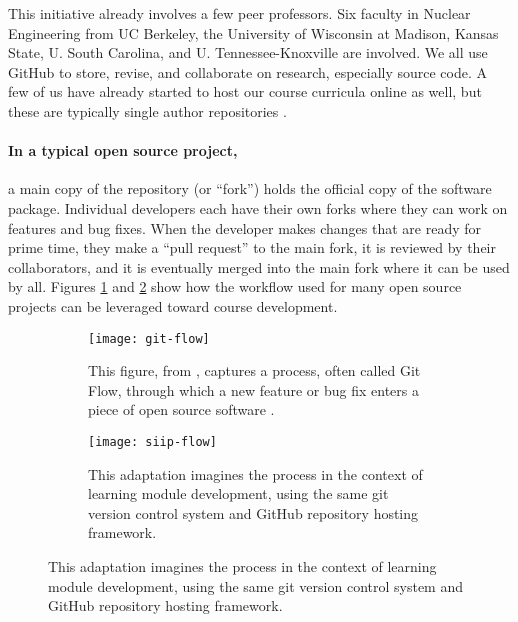 \documentclass[11pt]{article}
\begin{document}
          
          This initiative already involves a few peer professors. Six faculty 
          in Nuclear Engineering from UC Berkeley, the University of Wisconsin 
          at Madison, Kansas State, U. South Carolina, and U. 
          Tennessee-Knoxville are involved. We all use GitHub \cite{github} to 
          store, revise, and collaborate on research, especially source code. A 
          few of us have already started to host our course curricula online as 
          well, but these are typically single author repositories 
          \cite{skutnik,wilson,slaybaugh,scopatz,borelli,roberts}.

          \paragraph{In a typical open source project,} a main copy of the 
          repository (or ``fork'') holds the 
          official copy of the software package. Individual developers each have their own 
          forks where they can work on features and 
          bug fixes. When the developer makes changes that are ready for prime 
          time, they make a ``pull request'' to the main fork, it is 
          reviewed by their collaborators, and it is eventually merged into the 
          main fork where it can be used by all. Figures 
          \ref{fig:sub1} and \ref{fig:sub2} show how the workflow used for many 
          open source projects can be leveraged toward course development.

          \begin{figure}
                  \centering
                  \begin{subfigure}{.4\textwidth}
                            \centering
                              \texttt{[image: git-flow]}
        \caption{This figure, from \cite{scopatz_effective_2016}, captures a process, often called Git Flow, through which a new feature or bug fix enters a piece of open source software \cite{scopatz_effective_2016}.}
                                  \label{fig:sub1}
                  \end{subfigure}\hfill%
                  \begin{subfigure}{.4\textwidth}
                            \centering
                              \texttt{[image: siip-flow]}
  \caption{This adaptation imagines the process in the context of learning module development, using the same git version control system and GitHub repository hosting framework.}
                                  \label{fig:sub2}
                  \end{subfigure}
                  \label{fig:test}
          \end{figure}
\end{document}
